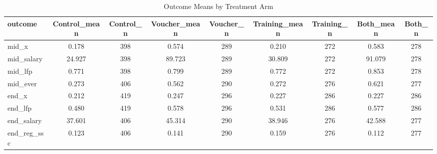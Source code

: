 \begin{table}[htbp]
\centering
\caption{Outcome Means by Treatment Arm}
\label{tab:arm_means}
\begin{tabular}{lcccccccc}
\hline\hline
outcome & Control\_mean & Control\_n & Voucher\_mean & Voucher\_n & Training\_mean & Training\_n & Both\_mean & Both\_n \\
\hline
mid\_x & 0.178 & 398 & 0.574 & 289 & 0.210 & 272 & 0.583 & 278 \\
mid\_salary & 24.927 & 398 & 89.723 & 289 & 30.809 & 272 & 91.079 & 278 \\
mid\_lfp & 0.771 & 398 & 0.799 & 289 & 0.772 & 272 & 0.853 & 278 \\
mid\_ever & 0.273 & 406 & 0.562 & 290 & 0.272 & 276 & 0.621 & 277 \\
end\_x & 0.212 & 419 & 0.247 & 296 & 0.227 & 286 & 0.227 & 286 \\
end\_lfp & 0.480 & 419 & 0.578 & 296 & 0.531 & 286 & 0.577 & 286 \\
end\_salary & 37.601 & 406 & 45.314 & 290 & 38.946 & 276 & 42.588 & 277 \\
end\_reg\_ssc & 0.123 & 406 & 0.141 & 290 & 0.159 & 276 & 0.112 & 277 \\
\hline\hline
\end{tabular}
\end{table}